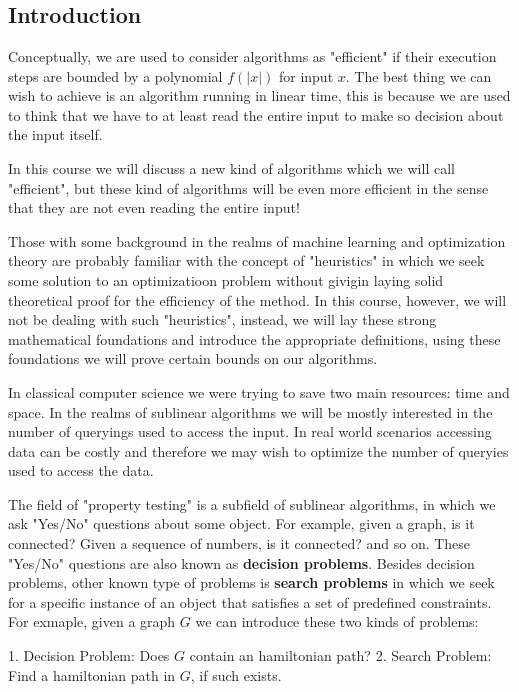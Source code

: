 \chapter{}
\section{Introduction}
Conceptually, we are used to consider algorithms as "efficient" if their execution steps are bounded by a polynomial $f(|x|)$ for input $x$.
The best thing we can wish to achieve is an algorithm running in linear time, this is because we are used to think that we have to at least read the entire input to make so decision about the input itself.

In this course we will discuss a new kind of algorithms which we will call "efficient", but these kind of algorithms will be even more efficient in the sense that they are not even reading the entire input!

Those with some background in the realms of machine learning and optimization theory are probably familiar with the concept of "heuristics" in which we seek some solution to an optimizatioon problem without givigin laying solid theoretical proof for the efficiency of the method.
In this course, however, we will not be dealing with such "heuristics", instead, we will lay these strong mathematical foundations and introduce the appropriate definitions, using these foundations we will prove certain bounds on our algorithms.

In classical computer science we were trying to save two main resources: time and space. In the realms of sublinear algorithms we will be mostly interested in the number of queryings used to access the input. In real world scenarios accessing data can be costly and therefore we may wish to optimize the number of queryies used to access the data.

The field of "property testing" is a subfield of sublinear algorithms,  in which we ask "Yes/No" questions about some object.
For example, given a graph, is it connected? Given a sequence of numbers, is it connected? and so on. 
These "Yes/No"  questions are also known as \textbf{decision problems}.
Besides decision problems, other known type of problems is \textbf{search problems} in which we seek for a specific instance of an object that satisfies a set of predefined constraints. 
For exmaple, given a graph $G$ we can introduce these two kinds of problems:

1. Decision Problem: Does $G$ contain an hamiltonian path?
2. Search Problem: Find a hamiltonian path in $G$, if such exists.

